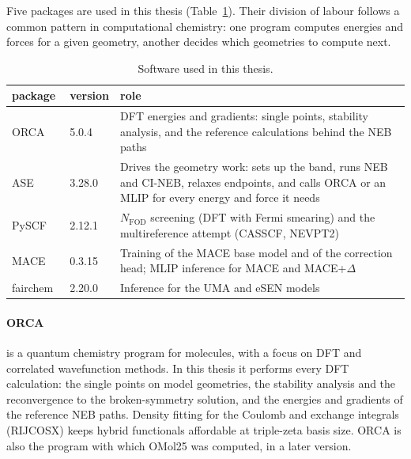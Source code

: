 Five packages are used in this thesis (Table~\ref{tab:software}). Their
division of labour follows a common pattern in computational chemistry:
one program computes energies and forces for a given geometry, another
decides which geometries to compute next.

\begin{table}[h]
\centering
\small
\caption{Software used in this thesis.}
\label{tab:software}
\begin{tabular}{@{}l l p{7.6cm}@{}}
\toprule
package & version & role \\
\midrule
ORCA~\cite{orca5} & 5.0.4 &
  DFT energies and gradients: single points, stability analysis,
  and the reference calculations behind the NEB paths \\
ASE~\cite{larsen2017ase} & 3.28.0 &
  Drives the geometry work: sets up the band, runs NEB and CI-NEB,
  relaxes endpoints, and calls ORCA or an MLIP for every energy and
  force it needs \\
PySCF~\cite{pyscf} & 2.12.1 &
  $N_\text{FOD}$ screening (DFT with Fermi smearing) and the
  multireference attempt (CASSCF, NEVPT2) \\
MACE~\cite{mace_code} & 0.3.15 &
  Training of the MACE base model and of the correction head; MLIP
  inference for MACE and MACE+$\Delta$ \\
fairchem~\cite{fairchem} & 2.20.0 &
  Inference for the UMA and eSEN models \\
\bottomrule
\end{tabular}
\end{table}

\paragraph{ORCA} is a quantum chemistry program for molecules, with a
focus on DFT and correlated wavefunction methods. In this thesis it
performs every DFT calculation: the single points on model geometries,
the stability analysis and the reconvergence to the broken-symmetry
solution, and the energies and gradients of the reference NEB paths.
Density fitting for the Coulomb and exchange integrals (RIJCOSX) keeps
hybrid functionals affordable at triple-zeta basis size. ORCA is also the
program with which OMol25 was computed, in a later version.

